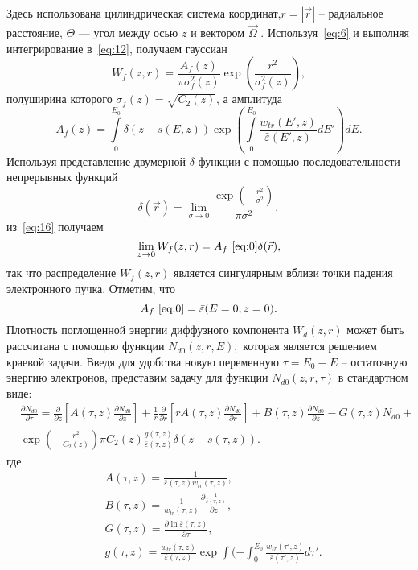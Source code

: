 Здесь использована цилиндрическая система координат,$r=|\vec{r}|$ -- радиальное
расстояние, $\Theta$ — угол между осью $z$ и вектором $\vec{\Omega}$ .
Используя~\ref{eq:6} и выполняя интегрирование в~\ref{eq:12}, получаем гауссиан
\begin{equation}
W_f(z,r)=\frac{A_f(z)}{\pi \sigma_f^2(z)} \exp \left(\frac{r^2}{\sigma_f^2(z)}\right),
\label{eq:15}
\end{equation}
полуширина которого $\sigma_f(z)=\sqrt{C_2 (z)}$, а амплитуда
\begin{equation}
A_f(z) = \int\limits_0^{E_0}\delta( z − s(E, z))\exp\left(\int\limits_0^{E_0}\frac{w_{tr} ( E′, z)}{\bar{\varepsilon}(E′, z)}dE′\right) dE.
\end{equation}
Используя представление двумерной \(\delta\)-функции с помощью последовательности непрерывных функций \cite{korn}
\begin{equation}
\delta(\vec{r}) = \lim_{\sigma\rightarrow0} \frac{\exp\left(−\frac{r^2}{\sigma^2}\right)}{\pi\sigma^2},
\end{equation}
из~\ref{eq:16} получаем
\begin{equation}
\lim_{z\rightarrow0} W_f(z, r) = A_f~\ref{eq:0}\delta(\vec{r}),
\end{equation}
так что распределение \( W_f(z, r) \) является сингулярным вблизи точки падения
электронного пучка. Отметим, что
\begin{equation}
    A_f~\ref{eq:0} = \bar{\varepsilon}(E=0, z=0).    
\end{equation}
Плотность поглощенной энергии диффузного компонента \(W_d(z, r)\) может быть
рассчитана с помощью функции \(N_{d0}(z, r, E),\) которая является решением краевой задачи.
Введя для удобства новую переменную \(\tau=E_0-E\) -- остаточную энергию электронов,
представим задачу для функции \(N_{d0}(z, r, \tau)\) в стандартном виде:
\begin{align}
& \frac{\partial N_{d0}}{\partial\tau} = \frac{\partial}{\partial z}\left[A (\tau , z )\frac{\partial N_{d0}}{\partial z}\right]
+ \frac{1}{r}\frac{\partial}{\partial r}\left[rA(\tau, z)
\frac{\partial N_{d0}}{\partial r}\right] + B (\tau , z )
\frac{\partial N_{d0}}{\partial z} − G (\tau , z )N_{d0}
+ \\
& \exp\left( −\frac{r^2}{C_2(z)}\right)\pi C_2(z)\frac{g(\tau, z)}{\bar{\varepsilon} (\tau , z ) }\delta ( z − s(\tau , z )).
\nonumber
\end{align}
где
\begin{align}
& A (\tau, z) = \frac{1}{\bar{\varepsilon}(\tau, z)w_{tr} (\tau, z)}, \\
& B (\tau, z) = \frac{1}{w_{tr}(\tau, z)}\frac{\partial\frac{1}{\bar{\varepsilon}(\tau, z)}}{\partial z}, \\
& G (\tau, z) = \frac{\partial\ln\bar{\varepsilon}(\tau, z )}{\partial\tau},\\
& g(\tau, z) = \frac{w_{tr}(\tau , z )}{\bar{\varepsilon} (\tau , z )}\exp\int( −\int_0^{E_0} \frac{w_{tr}(\tau′, z )}{\bar{\varepsilon} (\tau′, z)}d\tau′.    
\end{align}

